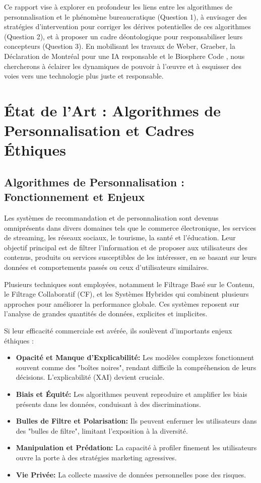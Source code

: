 \documentclass[11pt,a4paper]{article}
\begin{document}
Ce rapport vise à explorer en profondeur les liens entre les algorithmes de personnalisation et le phénomène bureaucratique (Question 1), à envisager des stratégies d'intervention pour corriger les dérives potentielles de ces algorithmes (Question 2), et à proposer un cadre déontologique pour responsabiliser leurs concepteurs (Question 3). En mobilisant les travaux de Weber, Graeber, la Déclaration de Montréal pour une IA responsable \cite{DeclarationMontreal2018} et le Biosphere Code \cite{BiosphereCode2015}, nous chercherons à éclairer les dynamiques de pouvoir à l'œuvre et à esquisser des voies vers une technologie plus juste et responsable.

\section{État de l'Art : Algorithmes de Personnalisation et Cadres Éthiques}

\subsection{Algorithmes de Personnalisation : Fonctionnement et Enjeux}
Les systèmes de recommandation et de personnalisation sont devenus omniprésents dans divers domaines tels que le commerce électronique, les services de streaming, les réseaux sociaux, le tourisme, la santé et l'éducation. Leur objectif principal est de filtrer l'information et de proposer aux utilisateurs des contenus, produits ou services susceptibles de les intéresser, en se basant sur leurs données et comportements passés ou ceux d'utilisateurs similaires.

Plusieurs techniques sont employées, notamment le Filtrage Basé sur le Contenu, le Filtrage Collaboratif (CF), et les Systèmes Hybrides qui combinent plusieurs approches pour améliorer la performance globale. Ces systèmes reposent sur l'analyse de grandes quantités de données, explicites et implicites.

Si leur efficacité commerciale est avérée, ils soulèvent d'importants enjeux éthiques :
\begin{itemize}
    \item \textbf{Opacité et Manque d'Explicabilité:} Les modèles complexes fonctionnent souvent comme des "boîtes noires", rendant difficile la compréhension de leurs décisions. L'explicabilité (XAI) devient cruciale.
    \item \textbf{Biais et Équité:} Les algorithmes peuvent reproduire et amplifier les biais présents dans les données, conduisant à des discriminations.
    \item \textbf{Bulles de Filtre et Polarisation:} Ils peuvent enfermer les utilisateurs dans des "bulles de filtre", limitant l'exposition à la diversité.
    \item \textbf{Manipulation et Prédation:} La capacité à profiler finement les utilisateurs ouvre la porte à des stratégies marketing agressives.
    \item \textbf{Vie Privée:} La collecte massive de données personnelles pose des risques.
\end{itemize}
\end{document}
